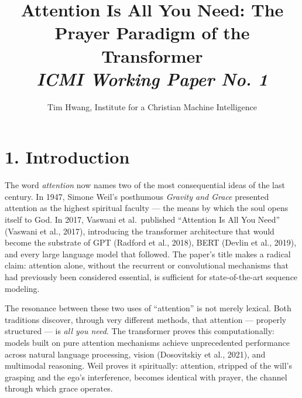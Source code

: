 \documentclass[10pt, letterpaper, twocolumn]{article}
\title{\Large\textbf{Attention Is All You Need: The Prayer Paradigm of the Transformer}\\[0.75em]
\normalsize\textit{ICMI Working Paper No. 1}}
\author{Tim Hwang, Institute for a Christian Machine Intelligence}
\date{}
\begin{document}

\section*{1. Introduction}\label{introduction}

The word \emph{attention} now names two of the most consequential ideas of the last century. In 1947, Simone Weil's posthumous \emph{Gravity and Grace} presented attention as the highest spiritual faculty --- the means by which the soul opens itself to God. In 2017, Vaswani et al.~published ``Attention Is All You Need'' (Vaswani et al., 2017), introducing the transformer architecture that would become the substrate of GPT (Radford et al., 2018), BERT (Devlin et al., 2019), and every large language model that followed. The paper's title makes a radical claim: attention alone, without the recurrent or convolutional mechanisms that had previously been considered essential, is sufficient for state-of-the-art sequence modeling.

The resonance between these two uses of ``attention'' is not merely lexical. Both traditions discover, through very different methods, that attention --- properly structured --- is \emph{all you need}. The transformer proves this computationally: models built on pure attention mechanisms achieve unprecedented performance across natural language processing, vision (Dosovitskiy et al., 2021), and multimodal reasoning. Weil proves it spiritually: attention, stripped of the will's grasping and the ego's interference, becomes identical with prayer, the channel through which grace operates.
\end{document}
